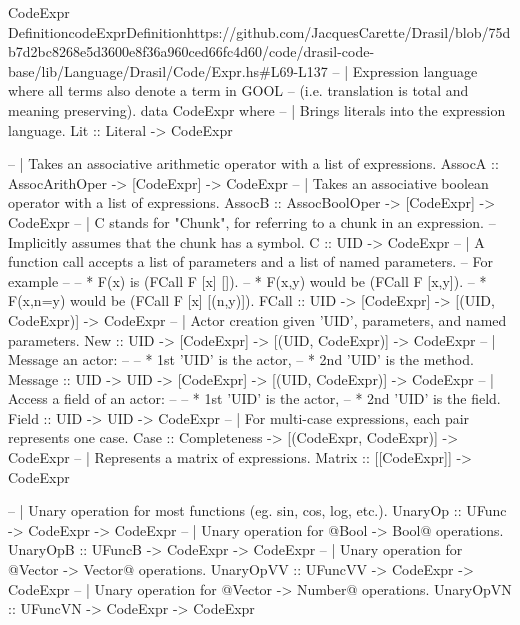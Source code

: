\begin{haskell}{CodeExpr Definition}{codeExprDefinition}{https://github.com/JacquesCarette/Drasil/blob/75db7d2bc8268e5d3600e8f36a960ced66fc4d60/code/drasil-code-base/lib/Language/Drasil/Code/Expr.hs\#L69-L137}
-- | Expression language where all terms also denote a term in GOOL
--   (i.e. translation is total and meaning preserving).
data CodeExpr where
  -- | Brings literals into the expression language.
  Lit      :: Literal -> CodeExpr


  -- | Takes an associative arithmetic operator with a list of expressions.
  AssocA   :: AssocArithOper -> [CodeExpr] -> CodeExpr
  -- | Takes an associative boolean operator with a list of expressions.
  AssocB   :: AssocBoolOper  -> [CodeExpr] -> CodeExpr
  -- | C stands for "Chunk", for referring to a chunk in an expression.
  --   Implicitly assumes that the chunk has a symbol.
  C        :: UID -> CodeExpr
  -- | A function call accepts a list of parameters and a list of named parameters.
  --   For example
  --
  --   * F(x) is (FCall F [x] []).
  --   * F(x,y) would be (FCall F [x,y]).
  --   * F(x,n=y) would be (FCall F [x] [(n,y)]).
  FCall    :: UID -> [CodeExpr] -> [(UID, CodeExpr)] -> CodeExpr
  -- | Actor creation given 'UID', parameters, and named parameters.
  New      :: UID -> [CodeExpr] -> [(UID, CodeExpr)] -> CodeExpr
  -- | Message an actor:
  --
  --   * 1st 'UID' is the actor,
  --   * 2nd 'UID' is the method.
  Message  :: UID -> UID -> [CodeExpr] -> [(UID, CodeExpr)] -> CodeExpr
  -- | Access a field of an actor:
  --
  --   * 1st 'UID' is the actor,
  --   * 2nd 'UID' is the field.
  Field    :: UID -> UID -> CodeExpr
  -- | For multi-case expressions, each pair represents one case.
  Case     :: Completeness -> [(CodeExpr, CodeExpr)] -> CodeExpr
  -- | Represents a matrix of expressions.
  Matrix   :: [[CodeExpr]] -> CodeExpr
  
  -- | Unary operation for most functions (eg. sin, cos, log, etc.).
  UnaryOp       :: UFunc -> CodeExpr -> CodeExpr
  -- | Unary operation for @Bool -> Bool@ operations.
  UnaryOpB      :: UFuncB -> CodeExpr -> CodeExpr
  -- | Unary operation for @Vector -> Vector@ operations.
  UnaryOpVV     :: UFuncVV -> CodeExpr -> CodeExpr
  -- | Unary operation for @Vector -> Number@ operations.
  UnaryOpVN     :: UFuncVN -> CodeExpr -> CodeExpr



\end{haskell}
